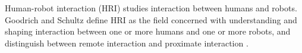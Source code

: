 





Human-robot interaction (HRI) studies interaction between humans and robots. Goodrich and Schultz define HRI as the field concerned with understanding and shaping interaction between one or more humans and one or more robots, and distinguish between remote interaction and proximate interaction \cite[204, 216]{goodrich_human-robot_2007}.

